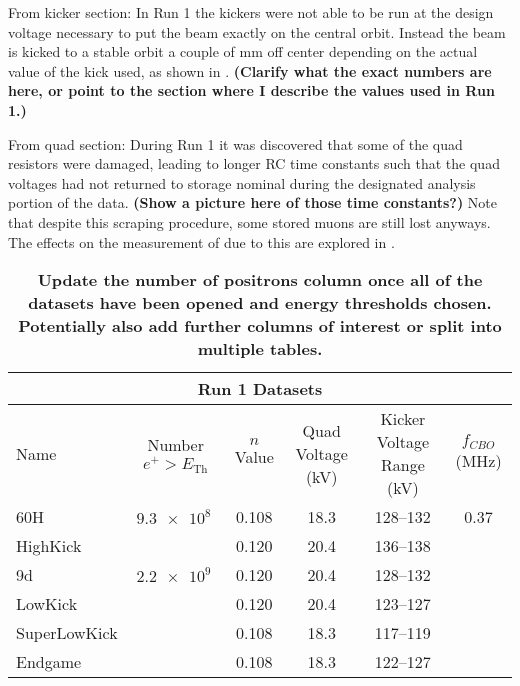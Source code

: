 From kicker section:
In Run 1 the kickers were not able to be run at the design voltage necessary to put the beam exactly on the central orbit. Instead the beam is kicked to a stable orbit a couple of mm off center depending on the actual value of the kick used, as shown in . \textbf{(Clarify what the exact numbers are here, or point to the section where I describe the values used in Run 1.)}  


From quad section:
During Run 1 it was discovered that some of the quad resistors were damaged, leading to longer RC time constants such that the quad voltages had not returned to storage nominal during the designated analysis portion of the data. \textbf{(Show a picture here of those time constants?)} Note that despite this scraping procedure, some stored muons are still lost anyways. The effects on the measurement of \wa due to this are explored in .




\cite{Run1Datasets}




\begin{landscape}
\begin{table}[]
\centering
\setlength\tabcolsep{10pt}
\renewcommand{\arraystretch}{1.2}
\begin{tabular*}{1\linewidth}{@{\extracolsep{\fill}}lccccc}
  \hline
    \multicolumn{6}{c}{\textbf{Run 1 Datasets}} \\
  \hline\hline
    Name & Number $e^{+} > E_{\text{Th}}$ & $n$ Value & Quad Voltage (kV) & Kicker Voltage Range (kV) & $f_{CBO}$ (MHz) \\
  \hline
    60H & $\SI{9.3e8}{}$ & 0.108 & 18.3 & \SIrange{128}{132}{} & 0.37 \\
    HighKick &  & 0.120 & 20.4 & \SIrange{136}{138}{} &  \\
    9d & $\SI{2.2e9}{}$ & 0.120 & 20.4 & \SIrange{128}{132}{} &  \\
    LowKick &  & 0.120 & 20.4 & \SIrange{123}{127}{} &  \\
    SuperLowKick & & 0.108 & 18.3 & \SIrange{117}{119}{} &  \\
    Endgame &  & 0.108 & 18.3 & \SIrange{122}{127}{} &  \\
  \hline
  \hline
\end{tabular*}
\caption[Run 1 datasets]{ \textbf{Update the number of positrons column once all of the datasets have been opened and energy thresholds chosen. Potentially also add further columns of interest or split into multiple tables.}}
\label{tab:Run1Datasets}
\end{table}
\end{landscape}





\clearpage




